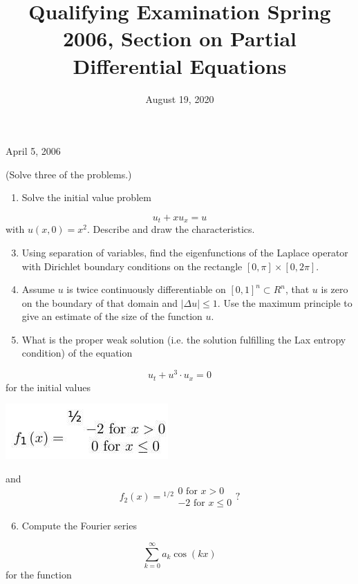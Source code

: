 \documentclass[10pt]{article}
\title{Qualifying Examination Spring 2006, Section on Partial Differential Equations }
\author{August 19, 2020}
\date{}
\begin{document}
\maketitle
April 5, 2006

(Solve three of the problems.)

\begin{enumerate}
  \item Solve the initial value problem
\end{enumerate}
$$
u_{t}+x u_{x}=u
$$
with $u(x, 0)=x^{2}$. Describe and draw the characteristics.

\begin{enumerate}
  \setcounter{enumi}{2}
  \item Using separation of variables, find the eigenfunctions of the Laplace operator with Dirichlet boundary conditions on the rectangle $[0, \pi] \times[0,2 \pi]$.

  \item Assume $u$ is twice continuously differentiable on $[0,1]^{n} \subset R^{n}$, that $u$ is zero on the boundary of that domain and $|\Delta u| \leq 1$. Use the maximum principle to give an estimate of the size of the function $u$.

  \item What is the proper weak solution (i.e. the solution fulfilling the Lax entropy condition) of the equation

\end{enumerate}
$$
u_{t}+u^{3} \cdot u_{x}=0
$$
for the initial values

\includegraphics[max width=\textwidth]{2022_05_24_3cb84f0d9d0ada46d202g-01}

and
$$
f_{2}(x)={ }^{1 / 2} \begin{gathered}
0 \text { for } x>0 \\
-2 \text { for } x \leq 0
\end{gathered} ?
$$

\begin{enumerate}
  \setcounter{enumi}{5}
  \item Compute the Fourier series
\end{enumerate}
$$
\sum_{k=0}^{\infty} a_{k} \cos (k x)
$$
for the function
\end{document}
